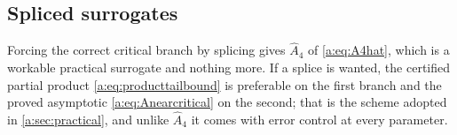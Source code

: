 \subsection*{Spliced surrogates}

Forcing the correct critical branch by splicing gives $\hat A_4$ of
\cref{a:eq:A4hat}, which is a workable practical surrogate and nothing more. If a
splice is wanted, the certified partial product \cref{a:eq:producttailbound} is
preferable on the first branch and the proved asymptotic \cref{a:eq:Anearcritical}
on the second; that is the scheme adopted in \cref{a:sec:practical}, and unlike
$\hat A_4$ it comes with error control at every parameter.

\renewcommand{\thesection}{\thechapter.\arabic{section}}
